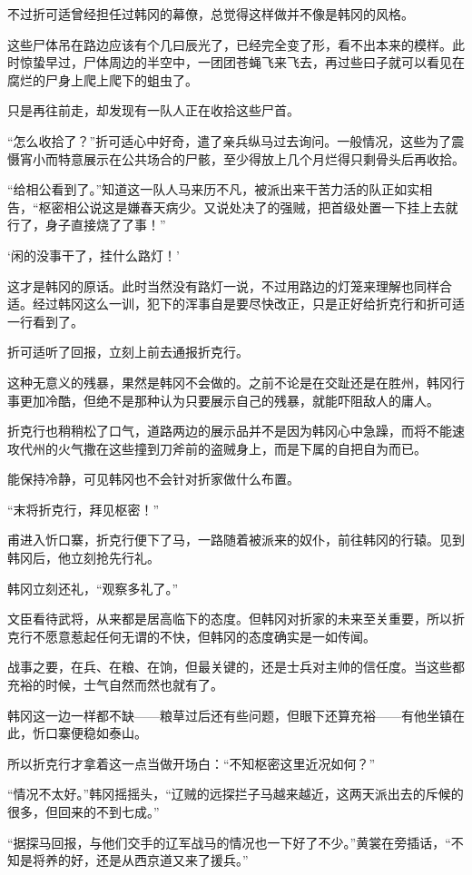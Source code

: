 不过折可适曾经担任过韩冈的幕僚，总觉得这样做并不像是韩冈的风格。

这些尸体吊在路边应该有个几曰辰光了，已经完全变了形，看不出本来的模样。此时惊蛰早过，尸体周边的半空中，一团团苍蝇飞来飞去，再过些曰子就可以看见在腐烂的尸身上爬上爬下的蛆虫了。

只是再往前走，却发现有一队人正在收拾这些尸首。

“怎么收拾了？”折可适心中好奇，遣了亲兵纵马过去询问。一般情况，这些为了震慑宵小而特意展示在公共场合的尸骸，至少得放上几个月烂得只剩骨头后再收拾。

“给相公看到了。”知道这一队人马来历不凡，被派出来干苦力活的队正如实相告，“枢密相公说这是嫌春天病少。又说处决了的强贼，把首级处置一下挂上去就行了，身子直接烧了了事！”

‘闲的没事干了，挂什么路灯！’

这才是韩冈的原话。此时当然没有路灯一说，不过用路边的灯笼来理解也同样合适。经过韩冈这么一训，犯下的浑事自是要尽快改正，只是正好给折克行和折可适一行看到了。

折可适听了回报，立刻上前去通报折克行。

这种无意义的残暴，果然是韩冈不会做的。之前不论是在交趾还是在胜州，韩冈行事更加冷酷，但绝不是那种认为只要展示自己的残暴，就能吓阻敌人的庸人。

折克行也稍稍松了口气，道路两边的展示品并不是因为韩冈心中急躁，而将不能速攻代州的火气撒在这些撞到刀斧前的盗贼身上，而是下属的自把自为而已。

能保持冷静，可见韩冈也不会针对折家做什么布置。

“末将折克行，拜见枢密！”

甫进入忻口寨，折克行便下了马，一路随着被派来的奴仆，前往韩冈的行辕。见到韩冈后，他立刻抢先行礼。

韩冈立刻还礼，“观察多礼了。”

文臣看待武将，从来都是居高临下的态度。但韩冈对折家的未来至关重要，所以折克行不愿意惹起任何无谓的不快，但韩冈的态度确实是一如传闻。

战事之要，在兵、在粮、在饷，但最关键的，还是士兵对主帅的信任度。当这些都充裕的时候，士气自然而然也就有了。

韩冈这一边一样都不缺——粮草过后还有些问题，但眼下还算充裕——有他坐镇在此，忻口寨便稳如泰山。

所以折克行才拿着这一点当做开场白：“不知枢密这里近况如何？”

“情况不太好。”韩冈摇摇头，“辽贼的远探拦子马越来越近，这两天派出去的斥候的很多，但回来的不到七成。”

“据探马回报，与他们交手的辽军战马的情况也一下好了不少。”黄裳在旁插话，“不知是将养的好，还是从西京道又来了援兵。”

